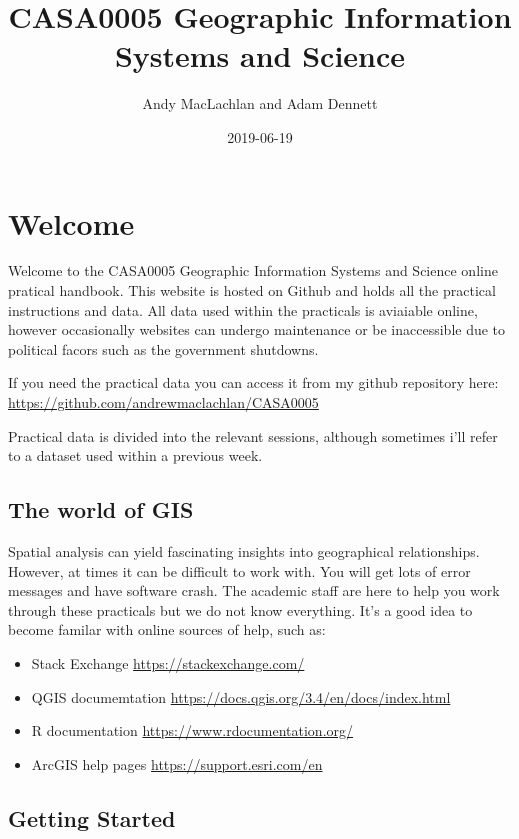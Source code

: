 \documentclass[]{book}
\title{CASA0005 Geographic Information Systems and Science}
\author{Andy MacLachlan and Adam Dennett}
\date{2019-06-19}
\providecommand{\tightlist}{%
  \setlength{\itemsep}{0pt}\setlength{\parskip}{0pt}}
\begin{document}
\maketitle

{
\setcounter{tocdepth}{1}
\tableofcontents
}
\hypertarget{welcome}{%
\chapter{Welcome}\label{welcome}}

Welcome to the CASA0005 Geographic Information Systems and Science online pratical handbook. This website is hosted on Github and holds all the practical instructions and data. All data used within the practicals is aviaiable online, however occasionally websites can undergo maintenance or be inaccessible due to political facors such as the government shutdowns.

If you need the practical data you can access it from my github repository here: \url{https://github.com/andrewmaclachlan/CASA0005}

Practical data is divided into the relevant sessions, although sometimes i'll refer to a dataset used within a previous week.

\hypertarget{the-world-of-gis}{%
\section{The world of GIS}\label{the-world-of-gis}}

Spatial analysis can yield fascinating insights into geographical relationships. However, at times it can be difficult to work with. You will get lots of error messages and have software crash. The academic staff are here to help you work through these practicals but we do not know everything. It's a good idea to become familar with online sources of help, such as:

\begin{itemize}
\tightlist
\item
  Stack Exchange \url{https://stackexchange.com/}
\item
  QGIS documemtation \url{https://docs.qgis.org/3.4/en/docs/index.html}
\item
  R documentation \url{https://www.rdocumentation.org/}
\item
  ArcGIS help pages \url{https://support.esri.com/en}
\end{itemize}

\hypertarget{getting-started}{%
\section{Getting Started}\label{getting-started}}
\end{document}
